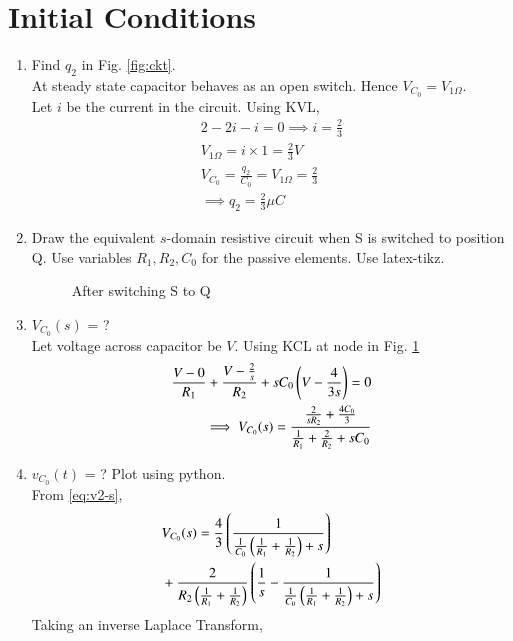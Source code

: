 \documentclass[journal,12pt,twocolumn]{IEEEtran}
\renewcommand\thesection{\arabic{section}}
\begin{document}
\section{Initial Conditions}
\begin{enumerate}[label=\arabic*.,ref=\thesection.\theenumi]
\item Find $q_2$ in Fig. \ref{fig:ckt}.\\
\solution At steady state capacitor behaves as an open switch. Hence $V_{C_0}=V_{1 \Omega}$.\\
Let $i$ be the current in the circuit. Using KVL,
\begin{align}
2-2i-i=0 \implies i=\frac{2}{3}\\
V_{1 \Omega}=i \times 1= \frac{2}{3} V\\
V_{C_0}=\frac{q_2}{C_0}=V_{1 \Omega}=\frac{2}{3}\\
\implies q_2=\frac{2}{3} \mu C
\end{align}
\item Draw the equivalent $s$-domain resistive circuit when S is switched to position Q.  Use variables $R_1, R_2, C_0$ for the passive elements.
Use latex-tikz.
\label{prob:init}\\
\solution 
\begin{figure}[!ht]
\centering

\caption{After switching S to Q}
\label{fig:sq}
\end{figure}
\item $V_{C_0}(s)$ = ?  \\
\solution Let voltage across capacitor be $V$. Using KCL at node in Fig. \ref{fig:sq}
\begin{align}
\frac{V - 0}{R_1} + \frac{V - \frac{2}{s}}{R_2} + sC_0\left(V - \frac{4}{3s}\right) = 0 \\
\implies V_{C_0}(s) = \frac{\frac{2}{sR_2} + \frac{4C_0}{3}}{\frac{1}{R_1} + \frac{2}{R_2} + sC_0}
\label{eq:v2-s}
\end{align} 
\item $v_{C_0}(t)$ = ? Plot using python.\\
\solution From \eqref{eq:v2-s},
\begin{align}
&V_{C_0}(s) = \frac{4}{3}\left(\frac{1}{\frac{1}{C_0}\left(\frac{1}{R_1} + \frac{1}{R_2}\right)+s}\right) \nonumber \\
&+ \frac{2}{R_2\left(\frac{1}{R_1} +\frac{1}{R_2}\right)}\left(\frac{1}{s} - \frac{1}{\frac{1}{C_0}\left(\frac{1}{R_1} + \frac{1}{R_2}\right) + s}\right)
\end{align}
Taking an inverse Laplace Transform,

\end{enumerate}
\end{document}
